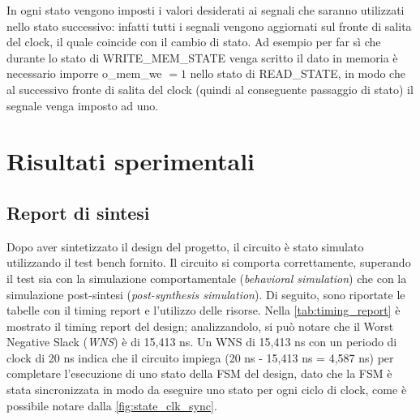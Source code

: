 \documentclass[11pt,a4paper]{article}
\newcommand{\m}[1]{{\fontfamily{zi4}\selectfont #1}}
\begin{document}
In ogni stato vengono imposti i valori desiderati ai segnali che saranno utilizzati nello stato successivo: infatti tutti i segnali vengono aggiornati sul fronte di salita del clock, il quale coincide con il cambio di stato. Ad esempio per far sì che durante lo stato di \m{WRITE\_MEM\_STATE} venga scritto il dato in memoria è necessario imporre \m{o\_mem\_we} $= 1$ nello stato di \m{READ\_STATE}, in modo che al successivo fronte di salita del clock (quindi al conseguente passaggio di stato) il segnale venga imposto ad uno.

\section{Risultati sperimentali}

\subsection{Report di sintesi}
Dopo aver sintetizzato il design del progetto, il circuito è stato simulato utilizzando il test bench fornito. Il circuito si comporta correttamente, superando il test sia con la simulazione comportamentale (\textit{behavioral simulation}) che con la simulazione post-sintesi (\textit{post-synthesis simulation}). Di seguito, sono riportate le tabelle con il timing report e l'utilizzo delle risorse. Nella \autoref{tab:timing_report} è mostrato il timing report del design; analizzandolo, si può notare che il Worst Negative Slack (\textit{WNS}) è di 15,413 ns. Un WNS di 15,413 ns con un periodo di clock di 20 ns indica che il circuito impiega (20 ns - 15,413 ns = 4,587 ns) per completare l'esecuzione di uno stato della FSM del design, dato che la FSM è stata sincronizzata in modo da eseguire uno stato per ogni ciclo di clock, come è possibile notare dalla \autoref{fig:state_clk_sync}.

\vspace{1em}
\end{document}
